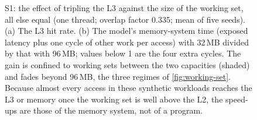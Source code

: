 \begin{figure}[htbp]
\begin{tikzpicture}
\end{tikzpicture}
\caption[S1: the effect of tripling the L3 against working-set size]{S1: the effect of tripling the L3 against the size of the working set, all else equal (one thread; overlap factor 0.335; mean of five seeds). (a) The L3 hit rate. (b) The model's memory-system time (exposed latency plus one cycle of other work per access) with 32\,MB divided by that with 96\,MB; values below 1 are the four extra cycles. The gain is confined to working sets between the two capacities (shaded) and fades beyond 96\,MB, the three regimes of \cref{fig:working-set}. Because almost every access in these synthetic workloads reaches the L3 or memory once the working set is well above the L2, the speed-ups are those of the memory system, not of a program.}
\label{fig:sim-working-set}
\end{figure}
